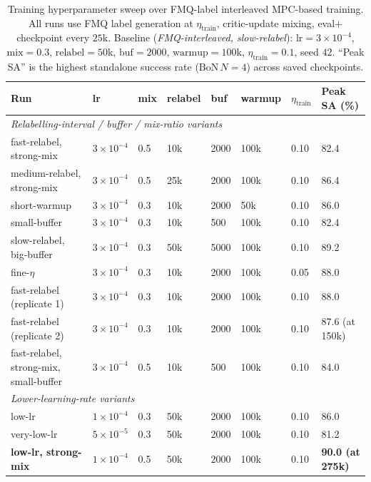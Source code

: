 \begin{table}[h]
\centering
\caption{Training hyperparameter sweep over FMQ-label interleaved
   MPC-based training. All runs use FMQ label generation at
   $\eta_{\text{train}}$, critic-update mixing, eval$+$checkpoint every
   $25$k. Baseline (\emph{FMQ-interleaved, slow-relabel}): $\mathrm{lr}=3
   {\times}10^{-4}$, $\mathrm{mix}=0.3$, $\mathrm{relabel}=50$k,
   $\mathrm{buf}=2000$, $\mathrm{warmup}=100$k, $\eta_{\text{train}}=0.1$,
   seed $42$. ``Peak SA'' is the highest standalone success rate
   ($\mathrm{BoN}\,N=4$) across saved checkpoints.}
\label{tab:app-train-sweep}
\begin{tabular}{l l l l l l l l}
\toprule
Run & lr & mix & relabel & buf & warmup & $\eta_{\text{train}}$ & Peak SA (\%) \\
\midrule
\multicolumn{8}{l}{\emph{Relabelling-interval / buffer / mix-ratio variants}} \\
fast-relabel, strong-mix          & $3{\times}10^{-4}$ & 0.5 & 10k & 2000 & 100k & 0.10 & 82.4 \\
medium-relabel, strong-mix        & $3{\times}10^{-4}$ & 0.5 & 25k & 2000 & 100k & 0.10 & 86.4 \\
short-warmup                      & $3{\times}10^{-4}$ & 0.3 & 10k & 2000 &  50k & 0.10 & 86.0 \\
small-buffer                      & $3{\times}10^{-4}$ & 0.3 & 10k &  500 & 100k & 0.10 & 82.4 \\
slow-relabel, big-buffer          & $3{\times}10^{-4}$ & 0.3 & 50k & 5000 & 100k & 0.10 & 89.2 \\
fine-$\eta$                       & $3{\times}10^{-4}$ & 0.3 & 10k & 2000 & 100k & 0.05 & 88.0 \\
fast-relabel (replicate 1)        & $3{\times}10^{-4}$ & 0.3 & 10k & 2000 & 100k & 0.10 & 88.0 \\
fast-relabel (replicate 2)        & $3{\times}10^{-4}$ & 0.3 & 10k & 2000 & 100k & 0.10 & 87.6 (at 150k) \\
fast-relabel, strong-mix, small-buffer & $3{\times}10^{-4}$ & 0.5 & 10k &  500 & 100k & 0.10 & 84.0 \\
\midrule
\multicolumn{8}{l}{\emph{Lower-learning-rate variants}} \\
low-lr                            & $1{\times}10^{-4}$ & 0.3 & 50k & 2000 & 100k & 0.10 & 86.0 \\
very-low-lr                       & $5{\times}10^{-5}$ & 0.3 & 50k & 2000 & 100k & 0.10 & 81.2 \\
\textbf{low-lr, strong-mix}       & $1{\times}10^{-4}$ & 0.5 & 50k & 2000 & 100k & 0.10 & \textbf{90.0 (at 275k)} \\
\bottomrule
\end{tabular}


\end{table}
